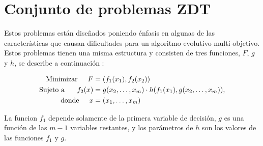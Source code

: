 \section{Conjunto de problemas ZDT}

Estos problemas est\'an dise\~nados poniendo \'enfasis en algunas de las caracter\'isticas que causan dificultades para un algoritmo 
evolutivo multi-objetivo. Estos problemas tienen una misma estructura y consisten de tres funciones, $F$, $g$ y $h$, se describe a 
continuaci\'on \cite{Zitzler2000}:

\begin{align*}
\text{Minimizar}\hspace{0.5cm} F&=(f_1(x_1),f_2(x_2))\\
\text{Sujeto a }\hspace{0.5cm} f_2(x)&=g(x_2,\ldots,x_m)\cdot h(f_1(x_1),g(x_2,\ldots,x_m)),\\
\text{donde}\hspace{0.5cm} x&= (x_1,\ldots, x_m)
\end{align*}

La funcion $f_1$ depende solamente de la primera variable de decisi\'on, $g$ es una funci\'on de las
$m-1$ variables restantes, y los par\'ametros de $h$ son los valores de las funciones $f_1$ y $g$.


